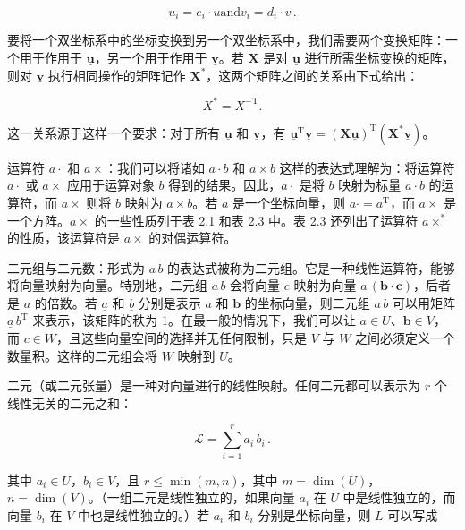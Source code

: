 \documentclass[10pt,a4paper]{book}
\theoremstyle{thmstyle} %
\theoremstyle{defstyle} %
\theoremstyle{prostyle} %
\begin{document}
$$
u _ { i } = e _ { i } \cdot u  \mathrm { a n d }  v _ { i } = d _ { i } \cdot v \, .
$$



要将一个双坐标系中的坐标变换到另一个双坐标系中，我们需要两个变换矩阵：一个用于作用于 $\underline{\boldsymbol{u}}$，另一个用于作用于 $\underline{\boldsymbol{v}}$。若 $\boldsymbol{X}$ 是对 $\underline{\boldsymbol{u}}$ 进行所需坐标变换的矩阵，则对 $\underline{\boldsymbol{v}}$ 执行相同操作的矩阵记作 $\boldsymbol{X}^{*}$，这两个矩阵之间的关系由下式给出：



$$
X ^{*} = X ^{- \mathrm { T} } .
$$



这一关系源于这样一个要求：对于所有 $\underline{\boldsymbol{u}}$ 和 $\underline{\boldsymbol{v}}$，有 $\underline{\boldsymbol{u}}^{\mathrm{T}}\underline{\boldsymbol{v}} = (\boldsymbol{X}\underline{\boldsymbol{u}})^{\mathrm{T}}(\boldsymbol{X}^{*}\underline{\boldsymbol{v}})$。



运算符 $a\cdot$ 和 $a\times$：我们可以将诸如 $a\cdot b$ 和 $a\times b$ 这样的表达式理解为：将运算符 $a\cdot$ 或 $a\times$ 应用于运算对象 $b$ 得到的结果。因此，$a\cdot$ 是将 $b$ 映射为标量 $a\cdot b$ 的运算符，而 $a\times$ 则将 $b$ 映射为 $a\times b$。若 $a$ 是一个坐标向量，则 $a\cdot = a^{\text{T}}$，而 $a\times$ 是一个方阵。$a\times$ 的一些性质列于表 2.1 和表 2.3 中。表 2.3 还列出了运算符 $a\times^{*}$ 的性质，该运算符是 $a\times$ 的对偶运算符。



二元组与二元数：形式为 $a\,b$ 的表达式被称为二元组。它是一种线性运算符，能够将向量映射为向量。特别地，二元组 $a\,b$ 会将向量 $c$ 映射为向量 $a\,(\boldsymbol{b}\cdot\boldsymbol{c})$，后者是 $a$ 的倍数。若 $\underline{a}$ 和 $\underline{b}$ 分别是表示 $a$ 和 $\boldsymbol{b}$ 的坐标向量，则二元组 $a\,b$ 可以用矩阵 $\underline{a}\,b^{\text{T}}$ 来表示，该矩阵的秩为 1。在最一般的情况下，我们可以让 $a\in U$、$\boldsymbol{b}\in V$，而 $c\in W$，且这些向量空间的选择并无任何限制，只是 $V$ 与 $W$ 之间必须定义一个数量积。这样的二元组会将 $W$ 映射到 $U$。



二元（或二元张量）是一种对向量进行的线性映射。任何二元都可以表示为 $r$ 个线性无关的二元之和：



$$
{ \mathcal L } = \sum _ { i = 1 } ^{r} a _ { i } \, b _ { i } \, .
$$



其中 $a_{i} \in U$，$b_{i} \in V$，且 $r \leq \min(m, n)$，其中 $m = \dim(U)$，$n = \dim(V)$。（一组二元是线性独立的，如果向量 $a_{i}$ 在 $U$ 中是线性独立的，而向量 $b_{i}$ 在 $V$ 中也是线性独立的。）若 $a_{i}$ 和 $b_{i}$ 分别是坐标向量，则 $L$ 可以写成
\end{document}
